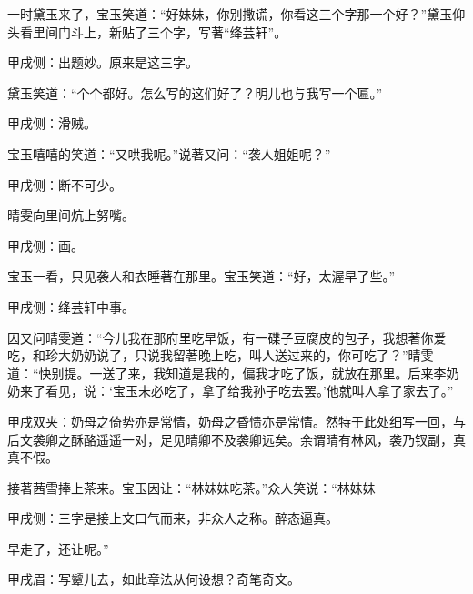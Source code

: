 \begin{parag}
    一时黛玉来了，宝玉笑道：“好妹妹，你别撒谎，你看这三个字那一个好？”黛玉仰头看里间门斗上，新贴了三个字，写著“绛芸轩”。\begin{note}甲戌侧：出题妙。原来是这三字。\end{note}黛玉笑道：“个个都好。怎么写的这们好了？明儿也与我写一个匾。”\begin{note}甲戌侧：滑贼。\end{note}宝玉嘻嘻的笑道：“又哄我呢。”说著又问：“袭人姐姐呢？”\begin{note}甲戌侧：断不可少。\end{note}晴雯向里间炕上努嘴。\begin{note}甲戌侧：画。\end{note}宝玉一看，只见袭人和衣睡著在那里。宝玉笑道：“好，太渥早了些。”\begin{note}甲戌侧：绛芸轩中事。\end{note}因又问晴雯道：“今儿我在那府里吃早饭，有一碟子豆腐皮的包子，我想著你爱吃，和珍大奶奶说了，只说我留著晚上吃，叫人送过来的，你可吃了？”晴雯道：“快别提。一送了来，我知道是我的，偏我才吃了饭，就放在那里。后来李奶奶来了看见，说：‘宝玉未必吃了，拿了给我孙子吃去罢。’他就叫人拿了家去了。”\begin{note}甲戌双夹：奶母之倚势亦是常情，奶母之昏愦亦是常情。然特于此处细写一回，与后文袭卿之酥酪遥遥一对，足见晴卿不及袭卿远矣。余谓晴有林风，袭乃钗副，真真不假。\end{note}接著茜雪捧上茶来。宝玉因让：“林妹妹吃茶。”众人笑说：“林妹妹\begin{note}甲戌侧：三字是接上文口气而来，非众人之称。醉态逼真。\end{note}早走了，还让呢。”\begin{note}甲戌眉：写颦儿去，如此章法从何设想？奇笔奇文。\end{note}
\end{parag}


